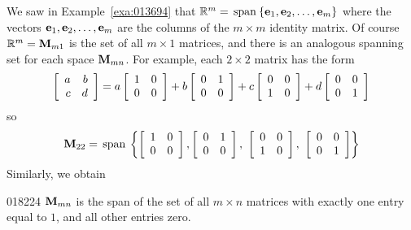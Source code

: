 We saw in Example~\ref{exa:013694} that $\mathbb{R}^m = \thinspace\operatorname{span\medspace}\{\textbf{e}_{1}, \textbf{e}_{2}, \dots, \textbf{e}_{m}\}$ where the vectors $\textbf{e}_{1}, \textbf{e}_{2}, \dots, \textbf{e}_{m}$ are the columns of the $m \times m$ identity matrix. Of course $\mathbb{R}^m = \textbf{M}_{m1}$ is the set of all $m \times 1$ matrices, and there is an analogous spanning set for each space $\textbf{M}_{mn}$. For example, each $2 \times 2$ matrix has the form
\begin{equation*}
\left[ \begin{array}{rr}
a & b \\
c & d
\end{array} \right]
= a \left[ \begin{array}{rr}
1 & 0 \\
0 & 0
\end{array} \right]
+ b \left[ \begin{array}{rr}
0 & 1 \\
0 & 0
\end{array} \right]
+ c \left[ \begin{array}{rr}
0 & 0 \\
1 & 0
\end{array} \right]
+ d \left[ \begin{array}{rr}
0 & 0 \\
0 & 1
\end{array} \right]
\end{equation*}
so
\begin{equation*}
\textbf{M}_{22} = \thinspace\operatorname{span\medspace}
\left \{
\left[ \begin{array}{rr}
1 & 0 \\
0 & 0
\end{array} \right], 
\left[ \begin{array}{rr}
0 & 1 \\
0 & 0
\end{array} \right],\
\left[ \begin{array}{rr}
0 & 0 \\
1 & 0
\end{array} \right],\
\left[ \begin{array}{rr}
0 & 0 \\
0 & 1
\end{array} \right]
\right \}
\end{equation*}
Similarly, we obtain

\begin{example}{}{018224}
$\textbf{M}_{mn}$ is the span of the set of all $m \times n$ matrices with exactly one entry equal to $1$, and all other entries zero.
\end{example}

